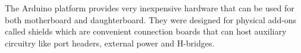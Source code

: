 The Arduino platform provides very inexpensive hardware that can be used for both motherboard and daughterboard. They were designed for physical add-ons called shields which are convenient connection boards that can host auxiliary circuitry like port headers, external power and H-bridges.


